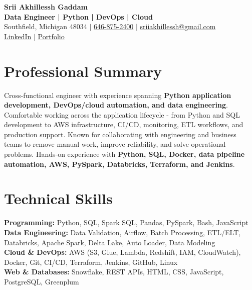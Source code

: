 \documentclass[letterpaper,10pt]{article}
\begin{document}
\fontsize{9.35pt}{10.45pt}\selectfont

\begin{center}
    {\LARGE \textbf{Srii Akhillessh Gaddam}} \\[-1pt]
    \textbf{Data Engineer | Python | DevOps | Cloud} \\[2pt]
    Southfield, Michigan 48034 $|$
    \href{tel:6468752400}{646-875-2400} $|$
    \href{mailto:sriiakhillessh@gmail.com}{sriiakhillessh@gmail.com} \\[1pt]
    \href{https://www.linkedin.com/in/srii-akhiilessh-gaddam-b48668191/}{LinkedIn} $|$
    \href{https://sriiakhillesshg.github.io/portfolio/}{Portfolio}
\end{center}
\vspace{-8pt}

\section{Professional Summary}
\small{Cross-functional engineer with experience spanning \textbf{Python application development, DevOps/cloud automation, and data engineering}. Comfortable working across the application lifecycle - from Python and SQL development to AWS infrastructure, CI/CD, monitoring, ETL workflows, and production support. Known for collaborating with engineering and business teams to remove manual work, improve reliability, and solve operational problems. Hands-on experience with \textbf{Python, SQL, Docker, data pipeline automation, AWS, PySpark, Databricks, Terraform, and Jenkins}.}

\section{Technical Skills}
\small{
\textbf{Programming:} Python, SQL, Spark SQL, Pandas, PySpark, Bash, JavaScript \\
\textbf{Data Engineering:} Data Validation, Airflow, Batch Processing, ETL/ELT, Databricks, Apache Spark, Delta Lake, Auto Loader, Data Modeling \\
\textbf{Cloud \& DevOps:} AWS (S3, Glue, Lambda, Redshift, IAM, CloudWatch), Docker, Git, CI/CD, Terraform, Jenkins, GitHub, Linux \\
\textbf{Web \& Databases:} Snowflake, REST APIs, HTML, CSS, JavaScript, PostgreSQL, Greenplum
}
\end{document}
